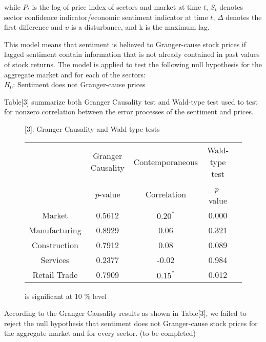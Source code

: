 \documentclass[12pt]{article}																																															%
\begin{document}
\par while $P_t$ is the log of price index of sectors and market at time $t$, $S_t$ denotes sector confidence indicator/economic sentiment indicator at time $t$,  $\Delta$  denotes the first difference and $\upsilon$ is a disturbance, and k is the maximum lag.
\par This model means that sentiment is believed to Granger-cause stock prices if lagged sentiment contain information that is not already contained in past values of stock returns. The model is applied to test the following null hypothesis for the aggregate market and for each of the sectors:
\vspace{0.3 cm}
\\ $H_{0}$: Sentiment does not Granger-cause prices 
\vspace{0.3 cm}
\par Table[3] summarize both Granger Causality test and Wald-type test used to test for nonzero correlation between the error processes of the sentiment and prices.

\begin{figure}[!htb]
	{\centering
		\begin{flushleft}
		\tablename{[3]: Granger Causality and Wald-type tests}
		\end{flushleft}}
	\begin{tabular}{|c|c|c|c|c|}
		\hline & Granger Causality & Contemporaneous & Wald-type test\\ 
		& \textit p-value & Correlation  & \textit p-value\\ 
		\hline Market &  0.5612 & $0.20^{*}$ & 0.000  \\ 
		Manufacturing & 0.8929 & 0.06 & 0.321  \\ 
		Construction & 0.7912 & 0.08 & 0.089   \\
		Services & 0.2377 & -0.02 & 0.984  \\
		Retail Trade & 0.7909 & $0.15^{*}$ & 0.012   \\
		\hline 
	\end{tabular} 
	\begin{flushleft}
		\footnotesize  * is significant at 10 \% level
	\end{flushleft}
\end{figure}

\par According to the Granger Causality results as shown in Table[3], we failed to reject the null hypothesis that sentiment does not Granger-cause stock prices for the aggregate market and for every sector. 
(to be completed)


\newpage





\end{document}

